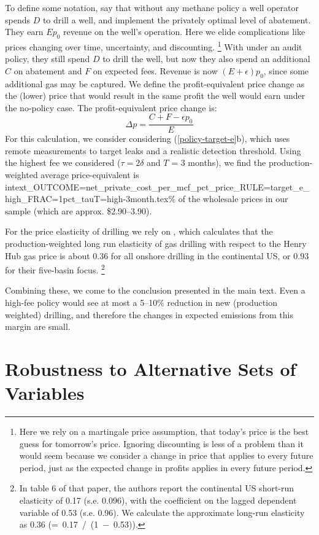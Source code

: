 To define some notation, say that without any methane policy a well operator spends \(D\) to drill a well, and implement the privately optimal level of abatement.
They earn \(E p_0\) revenue on the well's operation.
Here we elide complications like prices changing over time, uncertainty, and discounting.%
\footnote{%
Here we rely on a martingale price assumption, that today's price is the best guess for tomorrow's price.
Ignoring discounting is less of a problem than it would seem because we consider a change in price that applies to every future period, just as the expected change in profits applies in every future period.
}
With under an audit policy, they still spend \(D\) to drill the well, but now they also spend an additional \(C\) on abatement and \(F\) on expected fees.
Revenue is now \((E + \epsilon) p_0\), since some additional gas may be captured.
We define the profit-equivalent price change as the (lower) price that would result in the same profit the well would earn under the no-policy case.
The profit-equivalent price change is:
\[
\Delta p = \frac{C + F - \epsilon p_0}{E}
\]
For this calculation, we consider considering (\ref{policy-target-e}b), which uses remote measurements to target leaks and a realistic detection threshold.
Using the highest fee we considered (\(\tau = 2\delta\) and \(T\) = 3 months),
we find the production-weighted average price-equivalent is
{intext_OUTCOME=net_private_cost_per_mcf_pct_price_RULE=target_e_high_FRAC=1pct_tauT=high-3month.tex}\%
of the wholesale prices in our sample (which are approx. \$2.90--3.90).

For the price elasticity of drilling we rely on \textcite{Gilbert/Roberts:2020}, which calculates that the production-weighted long run elasticity of gas drilling with respect to the Henry Hub gas price is about 0.36 for all onshore drilling in the continental US, or 0.93 for their five-basin focus.
\footnote{%
In table 6 of that paper, the authors report the continental US short-run elasticity of 0.17 (s.e. 0.096), with the coefficient on the lagged dependent variable of 0.53 (s.e. 0.96).
We calculate the approximate long-run elasticity as 0.36 (\hbox{= 0.17 / (1 \(-\) 0.53)}).
}

Combining these, we come to the conclusion presented in the main text.
Even a high-fee policy would see at most a 5--10\% reduction in new (production weighted) drilling, and therefore the changes in expected emissions from this margin are small.

\section{Robustness to Alternative Sets of Variables}
\label{app:robustness-to-alternative-sets-of-variables}

